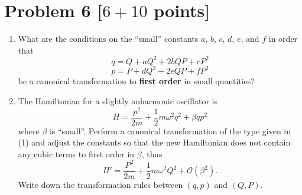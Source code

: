 \documentclass[11pt, a4paper]{article} %
\begin{document}
\section*{Problem 6 [$6 + 10$ points]}
\begin{enumerate}
\item[(1)]  What are the conditions on the ``small'' constants $a$, $b$, $c$, $d$, $e$, and $f$ in order that
\begin{equation*}
    q= Q+ aQ^2+2bQP + cP^2
\end{equation*}
\begin{equation*}
   p=P+dQ^2+2eQP+fP^2
\end{equation*}
be a canonical transformation to \textbf{first order} in small quantities?

\item[(2)] The Hamiltonian for a slightly anharmonic oscillator is
\begin{equation*}
   H=\frac{p^2}{2m} + \frac{1}{2}m\omega^2q^2 + \beta q p^2
\end{equation*}
where $\beta$ is ``small''. Perform a canonical transformation of the type given in (1) and adjust the constants so that the new Hamiltonian does not contain any cubic terms to first order in $\beta$, thus
\begin{equation*}
   H'=\frac{P^2}{2m} + \frac{1}{2}m\omega^2Q^2 + \mathcal{O}(\beta^2).
\end{equation*}
Write down the transformation rules between $(q, p)$ and $(Q, P)$.
\end{enumerate}
\end{document}
